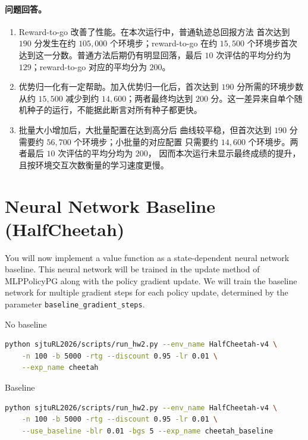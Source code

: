\documentclass{article}
\begin{document}
\paragraph{问题回答。}
\begin{enumerate}[label=(\arabic*)]
    \item Reward-to-go 改善了性能。在本次运行中，普通轨迹总回报方法
    首次达到 $190$ 分发生在约 $105{,}000$ 个环境步；reward-to-go 在约 $15{,}500$
    个环境步首次达到这一分数。普通方法后期仍有明显回落，最后 $10$ 次评估的平均分约为
    $129$；reward-to-go 对应的平均分为 $200$。
    \item 优势归一化有一定帮助。加入优势归一化后，首次达到
    $190$ 分所需的环境步数从约 $15{,}500$ 减少到约 $14{,}600$；两者最终均达到
    $200$ 分。这一差异来自单个随机种子的运行，不能据此断言对所有种子都更快。
    \item 批量大小增加后，大批量配置在达到高分后
    曲线较平稳，但首次达到 $190$ 分需要约 $56{,}700$ 个环境步；小批量的对应配置
    只需要约 $14{,}600$ 个环境步。两者最后 $10$ 次评估的平均分均为 $200$，
    因而本次运行未显示最终成绩的提升，且按环境交互次数衡量的学习速度更慢。
\end{enumerate}

\newpage

\section{Neural Network Baseline (HalfCheetah)}

You will now implement a value function as a state-dependent neural network baseline. This neural network will be trained in the update method of MLPPolicyPG along with the policy gradient update. We will train the baseline network for multiple gradient steps for each policy update, determined by the parameter \verb|baseline_gradient_steps|.

No baseline

\begin{lstlisting}[language=bash]
python sjtuRL2026/scripts/run_hw2.py --env_name HalfCheetah-v4 \
    -n 100 -b 5000 -rtg --discount 0.95 -lr 0.01 \
    --exp_name cheetah
\end{lstlisting}

Baseline

\begin{lstlisting}[language=bash]
python sjtuRL2026/scripts/run_hw2.py --env_name HalfCheetah-v4 \
    -n 100 -b 5000 -rtg --discount 0.95 -lr 0.01 \
    --use_baseline -blr 0.01 -bgs 5 --exp_name cheetah_baseline
\end{lstlisting}
\end{document}
